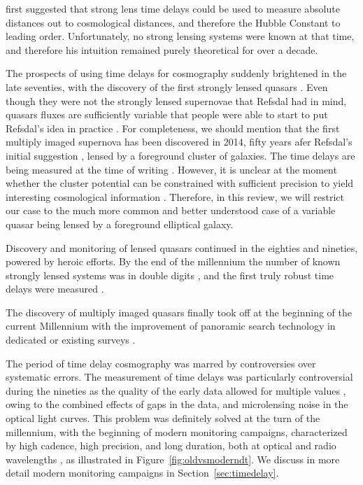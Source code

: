 \citet{Ref64} first suggested that strong lens time delays could be
used to measure absolute distances out to cosmological distances, and
therefore the Hubble Constant to leading order. Unfortunately, no
strong lensing systems were known at that time, and therefore his
intuition remained purely theoretical for over a decade.

The prospects of using time delays for cosmography suddenly brightened
in the late seventies, with the discovery of the first strongly lensed
quasars \citep{WCW79}. Even though they were not the strongly lensed
supernovae that Refsdal had in mind, quasars fluxes are sufficiently
variable \citep{Van82} that people were able to start to put Refsdal's
idea in practice \citep{Van89}. For completeness, we should mention
that the first multiply imaged supernova has been discovered in 2014,
fifty years afer Refsdal's initial suggestion \citep{Kel++15}, lensed
by a foreground cluster of galaxies. The time delays are being
measured at the time of writing
\citep{Rod++16,Kel++16}. However, it is unclear at the moment whether the
cluster potential can be constrained with sufficient precision to
yield interesting cosmological information \citep{Tre++16}. Therefore,
in this review, we will restrict our case to the much more common and
better understood case of a variable quasar being lensed by a
foreground elliptical galaxy.

Discovery and monitoring of lensed quasars continued in the eighties and
nineties, powered by heroic efforts. By the end of the millennium the
number of known strongly lensed systems was in double digits
\citep{CSS02} , and the first truly robust time delays were measured
\citep{Kun++97,Sch++97}.

The discovery of multiply imaged quasars finally took off at the
beginning of the current Millennium with the improvement of panoramic
search technology in dedicated or existing surveys
\citep{Bro++03,Oguri:2006p5865,Agn++15}.

The period of time delay cosmography was marred by controversies over
systematic errors.  The measurement of time delays was particularly
controversial during the nineties as the quality of the early data
allowed for multiple values \citep{PRH92}, owing to the combined
effects of gaps in the data, and microlensing noise in the optical
light curves. This problem was definitely solved at the turn of the
millennium, with the beginning of modern monitoring campaigns,
characterized by high cadence, high precision, and long duration, both
at optical and radio wavelengths
\citep{Fas++99,Fas++02,Bur++02,Eig++05}, as illustrated in Figure~\ref{fig:oldvsmoderndt}. We discuss in more detail
modern monitoring campaigns in Section~\ref{sec:timedelay}.

